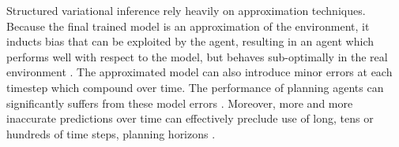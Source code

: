 Structured variational inference rely heavily on approximation techniques. Because the final trained model is an approximation of the environment, it inducts bias that can be exploited by the agent, resulting in an agent which performs well with respect to the model, but behaves sub-optimally in the real environment \cite{Algo.WorldModels}. The approximated model can also introduce minor errors at each timestep which compound over time. The performance of planning agents can significantly suffers from these model errors \cite{Study.PlanWithImperfectModel}. Moreover, more and more inaccurate predictions over time can effectively preclude use of long, tens or hundreds of time steps, planning horizons \cite{Algo.SimPLe}.
